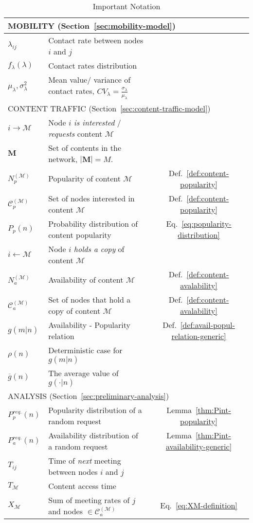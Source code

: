 \documentclass[journal]{IEEEtran}
\newcommand{\eq}[1]{Eq.~\eqref{#1}}
\newcommand{\Np}{N_{p}^{(\mathcal{M})}}
\newcommand{\Na}{N_{a}^{(\mathcal{M})}}
\newcommand{\Cp}{\mathcal{C}_{p}^{(\mathcal{M})}}
\newcommand{\Ca}{\mathcal{C}_{a}^{(\mathcal{M})}}
\newcommand{\XM}{{X}_{\mathcal{M}}}
\begin{document}
\begin{table}
 \centering
 \caption{Important Notation}
\begin{scriptsize}
\begin{tabular}{|l|l|c|}
\hline 
\multicolumn{3}{|l|}{MOBILITY (Section~\ref{sec:mobility-model})}\\
\hline
$\lambda_{ij}$	& Contact rate between nodes $i$ and $j$ &{}\\
\hline
$f_{\lambda}(\lambda)$		& Contact rates distribution & {}\\
\hline
$\mu_{\lambda}, \sigma_{\lambda}^{2}$	& Mean value/ variance of contact rates, $CV_{\lambda} = \frac{\sigma_{\lambda}}{\mu_{\lambda}}$& {}\\
\hline
\multicolumn{3}{|l|}{CONTENT TRAFFIC (Section~\ref{sec:content-traffic-model})}\\
\hline
$i\rightarrow\mathcal{M}$		& Node $i$ \textit{is interested} / \textit{requests} content $\mathcal{M}$ &{}\\
\hline
$\textbf{M}$		& Set of contents in the network, $| \textbf{M} | = M$. &{}\\
\hline
$\Np$	& Popularity of content $\mathcal{M}$ &{Def.~\ref{def:content-popularity}}\\
\hline
$\Cp$		& Set of nodes interested in content $\mathcal{M}$ &{Def.~\ref{def:content-popularity}}\\
\hline
$P_{p}(n)$		& Probability distribution of content popularity &\eq{eq:popularity-distribution} \\
\hline
$i \leftarrow\mathcal{M}$ &  Node $i$ \textit{holds a copy} of content $\mathcal{M}$ &{}\\
\hline
$\Na$	& Availability of content $\mathcal{M}$ &{Def.~\ref{def:content-avalability}}\\
\hline
$\Ca$		& Set of nodes that hold a copy of content $\mathcal{M}$ &{Def.~\ref{def:content-avalability}}\\
\hline
$g(m|n)$	& Availability - Popularity relation &{Def.~\ref{def:avail-popul-relation-generic}}\\
\hline
$\rho(n)$	& Deterministic case for $g(m|n)$&{}\\
\hline
$\overline{g}(n)$	&The average value of $g(\cdot|n)$&{}\\
\hline
\multicolumn{3}{|l|}{ANALYSIS (Section~\ref{sec:preliminary-analysis})}\\
\hline
$P_{p}^{req.}(n)$	& Popularity distribution of a random request&{Lemma~\ref{thm:Pint-popularity}}\\
\hline
$P_{a}^{req.}(n)$	& Availability distribution of a random request&{Lemma~\ref{thm:Pint-availability-generic}}\\
\hline
$T_{ij}$	& Time of \textit{next} meeting between nodes $i$ and $j$&{}\\
\hline
$T_{\mathcal{M}}$	& Content access time &{}\\
\hline
$\XM$	& Sum of meeting rates of $j$ and nodes $\in\Ca$&{\eq{eq:XM-definition}}\\
\hline
\end{tabular}
\end{scriptsize}
\label{table:notation}
\end{table}
\end{document}
